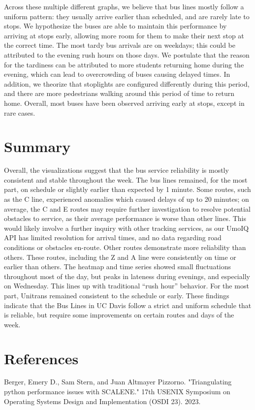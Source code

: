 \documentclass[]{article}
\begin{document}
	Across these multiple different graphs, we believe that bus lines mostly follow a uniform pattern: they usually arrive earlier than scheduled, and are rarely late to stops. We hypothesize the buses are able to maintain this performance by arriving at stops early, allowing more room for them to make their next stop at the correct time. The most tardy bus arrivals are on weekdays; this could be attributed to the evening rush hours on those days. We postulate that the reason for the tardiness can be attributed to more students returning home during the evening, which can lead to overcrowding of buses causing delayed times. In addition, we theorize that stoplights are configured differently during this period, and there are more pedestrians walking around this period of time to return home. Overall, most buses have been observed arriving early at stops, except in rare cases.
	\section{Summary}
	Overall, the visualizations suggest that the bus service reliability is mostly consistent and stable throughout the week. The bus lines remained, for the most part, on schedule or slightly earlier than expected by 1 minute. Some routes, such as the C line, experienced anomalies which caused delays of up to 20 minutes; on average, the C and E routes may require further investigation to resolve potential obstacles to service, as their average performance is worse than other lines. This would likely involve a further inquiry with other tracking services, as our UmoIQ API has limited resolution for arrival times, and no data regarding road conditions or obstacles en-route. Other routes demonstrate more reliability than others. These routes, including the Z and A line were consistently on time or earlier than others. The heatmap and time series showed small fluctuations throughout most of the day, but peaks in lateness during evenings, and especially on Wednesday. This lines up with traditional “rush hour” behavior. For the most part, Unitrans remained consistent to the schedule or early. These findings indicate that the Bus Lines in UC Davis follow a strict and uniform schedule that is reliable, but require some improvements on certain routes and days of the week.
	\section{References}
	Berger, Emery D., Sam Stern, and Juan Altmayer Pizzorno. "Triangulating python performance issues with {SCALENE}." 17th USENIX Symposium on Operating Systems Design and Implementation (OSDI 23). 2023.
	
\end{document}
